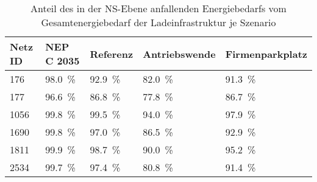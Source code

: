 {
\renewcommand{\arraystretch}{1.2}%
\begin{table}[H]
	\begin{center}
		\caption{Anteil des in der NS-Ebene anfallenden Energiebedarfs vom Gesamtenergiebedarf der Ladeinfrastruktur je Szenario}
		\begin{tabu} to \textwidth {X[0.5] X[1, r] X[1, r] X[1.2, r] X[1.2, r]}
			\hline
			Netz ID    & NEP C \num{2035}    & Referenz            & Antriebswende       & \glqq Firmenparkplatz\grqq \\ \hline
			\num{176}  & \SI{98.0}{\percent} & \SI{92.9}{\percent} & \SI{82.0}{\percent} & \SI{91.3}{\percent}        \\
			\num{177}  & \SI{96.6}{\percent} & \SI{86.8}{\percent} & \SI{77.8}{\percent} & \SI{86.7}{\percent}        \\
			\num{1056} & \SI{99.8}{\percent} & \SI{99.5}{\percent} & \SI{94.0}{\percent} & \SI{97.9}{\percent}        \\
			\num{1690} & \SI{99.8}{\percent} & \SI{97.0}{\percent} & \SI{86.5}{\percent} & \SI{92.9}{\percent}        \\
			\num{1811} & \SI{99.9}{\percent} & \SI{98.7}{\percent} & \SI{90.0}{\percent} & \SI{95.2}{\percent}        \\
			\num{2534} & \SI{99.7}{\percent} & \SI{97.4}{\percent} & \SI{80.8}{\percent} & \SI{91.4}{\percent}        \\ \hline
		\end{tabu}
		\label{tab:lvConnectionShare}
	\end{center}
	\vspace{-3mm}%
\end{table}
}